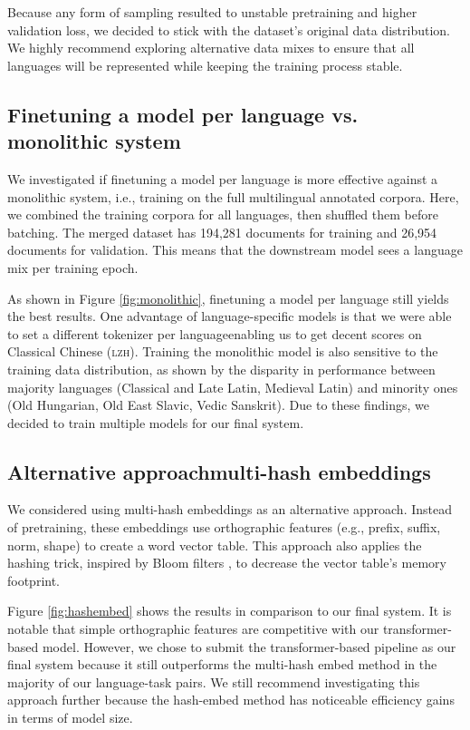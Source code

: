 \documentclass[11pt]{article}
\begin{document}
Because any form of sampling resulted to unstable pretraining and higher validation loss, we decided to stick with the dataset's original data distribution.
We highly recommend exploring alternative data mixes to ensure that all languages will be represented while keeping the training process stable.

\subsection{Finetuning a model per language vs. monolithic system}

We investigated if finetuning a model per language is more effective against a monolithic system, i.e., training on the full multilingual annotated corpora.
Here, we combined the training corpora for all languages, then shuffled them before batching.
The merged dataset has 194,281 documents for training and 26,954 documents for validation.
This means that the downstream model sees a language mix per training epoch.



As shown in Figure \ref{fig:monolithic}, finetuning a model per language still yields the best results.
One advantage of language-specific models is that we were able to set a different tokenizer per language\textemdash enabling us to get decent scores on Classical Chinese (\textsc{lzh}).
Training the monolithic model is also sensitive to the training data distribution, as shown by the disparity in performance between majority languages (Classical and Late Latin, Medieval Latin) and minority ones (Old Hungarian, Old East Slavic, Vedic Sanskrit).
Due to these findings, we decided to train multiple models for our final system.


\subsection{Alternative approach\textemdash multi-hash embeddings}

We considered using multi-hash embeddings \cite{miranda-etal-2022-multi} as an alternative approach.
Instead of pretraining, these embeddings use orthographic features (e.g., prefix, suffix, norm, shape) to create a word vector table.
This approach also applies the hashing trick, inspired by Bloom filters \cite{bloom-1970-space}, to decrease the vector table's memory footprint.


Figure \ref{fig:hashembed} shows the results in comparison to our final system.
It is notable that simple orthographic features are competitive with our transformer-based model.
However, we chose to submit the transformer-based pipeline as our final system because it still outperforms the multi-hash embed method in the majority of our language-task pairs.
We still recommend investigating this approach further because the hash-embed method has noticeable efficiency gains in terms of model size.
\end{document}
